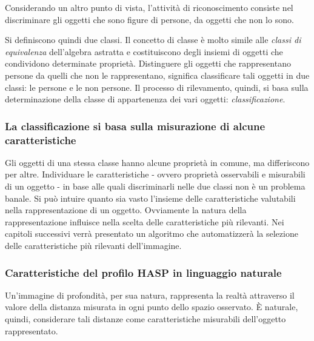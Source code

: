                 Considerando un altro punto di vista, l'attività di riconoscimento consiste nel discriminare gli oggetti che sono figure di persone, da oggetti che non lo sono.

                Si definiscono quindi due classi. Il concetto di classe è molto simile alle \emph{classi di equivalenza} dell'algebra astratta e costituiscono degli insiemi di oggetti che condividono determinate proprietà.
                Distinguere gli oggetti che rappresentano persone da quelli che non le rappresentano, significa classificare tali oggetti in due classi: le persone e le non persone.
                Il processo di rilevamento, quindi, si basa sulla determinazione della classe di appartenenza dei vari oggetti: \emph{classificazione}.

            \subsubsection{La classificazione si basa sulla misurazione di alcune caratteristiche}
                Gli oggetti di una stessa classe hanno alcune proprietà in comune, ma differiscono per altre.
                Individuare le caratteristiche - ovvero proprietà osservabili e misurabili di un oggetto - in base alle quali discriminarli nelle due classi non è un problema banale.
                Si può intuire quanto sia vasto l'insieme delle caratteristiche valutabili nella rappresentazione di un oggetto.
                Ovviamente la natura della rappresentazione influisce nella scelta delle caratteristiche più rilevanti.
                Nei capitoli successivi verrà presentato un algoritmo che automatizzerà la selezione delle caratteristiche più rilevanti dell'immagine.

            \subsubsection{Caratteristiche del profilo HASP in linguaggio naturale}
                Un'immagine di profondità, per sua natura, rappresenta la realtà attraverso il valore della distanza misurata in ogni punto dello spazio osservato. È naturale, quindi, considerare tali distanze come caratteristiche misurabili dell'oggetto rappresentato.

